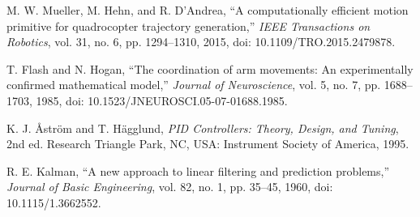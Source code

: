 \begin{enumerate}[label={[\arabic*]},leftmargin=*,itemsep=2pt]
\item M. W. Mueller, M. Hehn, and R. D'Andrea, ``A computationally efficient motion primitive for quadrocopter trajectory generation,'' \textit{IEEE Transactions on Robotics}, vol. 31, no. 6, pp. 1294--1310, 2015, doi: 10.1109/TRO.2015.2479878.
\item T. Flash and N. Hogan, ``The coordination of arm movements: An experimentally confirmed mathematical model,'' \textit{Journal of Neuroscience}, vol. 5, no. 7, pp. 1688--1703, 1985, doi: 10.1523/JNEUROSCI.05-07-01688.1985.
\item K. J. {\AA}str{\"o}m and T. H{\"a}gglund, \textit{PID Controllers: Theory, Design, and Tuning}, 2nd ed. Research Triangle Park, NC, USA: Instrument Society of America, 1995.
\item R. E. Kalman, ``A new approach to linear filtering and prediction problems,'' \textit{Journal of Basic Engineering}, vol. 82, no. 1, pp. 35--45, 1960, doi: 10.1115/1.3662552.
\end{enumerate}
